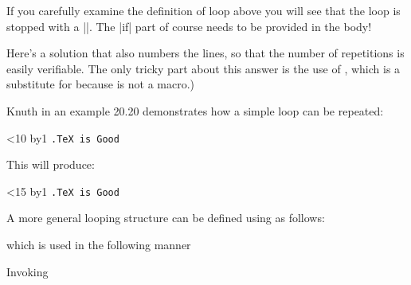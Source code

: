 If you carefully examine the definition of loop above you will see that the loop is stopped with a |\relax\fi|. The |if| part of course needs to be provided in the body!


Here's a solution that also numbers the lines, so that the number of repetitions
is easily verifiable. The only tricky part about this answer is the use of , which
is a substitute for  because  is not a  macro.)

Knuth in an example 20.20 demonstrates how a simple loop can be repeated:

\begin{teX}
\newcount\n
\def\punishment#1#2{\n=0
    \loop\ifnum\n<#2 \advance\n by1
         {\tt {\number\n.}#1\endgraf}\repeat}
    \punishment{TeX is Good}{10}
\end{teX}

This will produce:

\newcount\n
\def\punishment#1#2{\n=0
\loop\ifnum\n<#2 \advance\n by1
{\tt {\number\n.}#1\endgraf}\repeat}

\punishment{TeX is Good}{15}



A more general looping structure can be defined using \latex as follows:

\begin{teX}
\newcommand{\forloop}[5][1]%
{%
\setcounter{#2}{#3}%
\ifthenelse{#4}%
	{%
	#5%
	\addtocounter{#2}{#1}%
	\forloop[#1]{#2}{\value{#2}}{#4}{#5}%
	}%
	{%
	}%
}%
\end{teX}

which is used in the following manner


\begin{teX}
\end{teX}

\begin{teX}
\newcommand{\forLoop}[5][1]
{%
\setcounter{#4}{#2}%
\ifthenelse{ \value{#4} < #3 }%
	{%
	#5%
	\addtocounter{#4}{#1}%
	\forLoop[#1]{\value{#4}}{#3}{#4}{#5}%
	}%
	{%
	\ifthenelse{\value{#4} = #3}%
		{%
		#5%
		}%
		{}%
	}%
}
\end{teX}

Invoking

